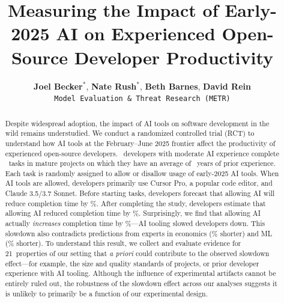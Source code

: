 \documentclass{article}
\newcommand{\NumFactorsTotal}{21}
\begin{document}
\title{Measuring the Impact of Early-2025 AI on Experienced Open-Source Developer Productivity}

\author{%
  \textbf{Joel Becker}$^*$, \textbf{Nate Rush}$^*$, \textbf{Beth Barnes}, \textbf{David Rein}\\[2ex]
  \normalsize\texttt{Model Evaluation \& Threat Research (METR)}
}

\maketitle
\begin{abstract}
    Despite widespread adoption, the impact of AI tools on software development in the wild remains understudied. We conduct a randomized controlled trial (RCT) to understand how AI tools at the February--June 2025 frontier affect the productivity of experienced open-source developers. 
    \NumDevelopers\ developers with moderate AI experience complete \NumIssuesAllInitialImplementationFinishedValid\ tasks in mature projects on which they have an average of \MeanDevExperienceOnReposYears\ years of prior experience. 
    Each task is randomly assigned to allow or disallow usage of early-2025 AI tools. When AI tools are allowed, developers primarily use Cursor Pro, a popular code editor, and Claude 3.5/3.7 Sonnet. 
    Before starting tasks, developers forecast that allowing AI will reduce completion time by \PctSpeedupForecastAbsValue \%.
    After completing the study, developers estimate that allowing AI reduced completion time by \PctSpeedupBackcastAbsValue \%.
    Surprisingly, we find that allowing AI actually \emph{increases} completion time by \PctSpeedupBaselineAbsValue \%---AI tooling slowed developers down.
    This slowdown also contradicts predictions from experts in economics (\PctSpeedupForecastEconomistsAbsValue\% shorter) and ML (\PctSpeedupForecastMLProfessionalsAbsValue\% shorter).
    To understand this result, we collect and evaluate evidence for \NumFactorsTotal\ properties of our setting that \textit{a priori} could contribute to the observed slowdown effect---for example, the size and quality standards of projects, or prior developer experience with AI tooling.
    Although the influence of experimental artifacts cannot be entirely ruled out, the robustness of the slowdown effect across our analyses suggests it is unlikely to primarily be a function of our experimental design.
\end{abstract}

\renewcommand{\thefootnote}{\fnsymbol{footnote}}
\end{document}
